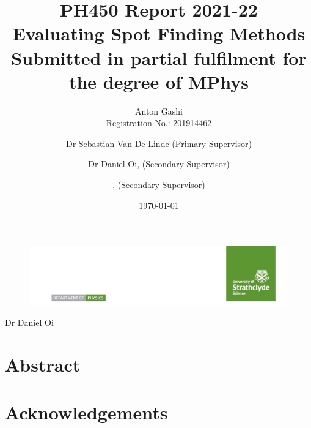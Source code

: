\documentclass[aps,pra,a4paper,nofootinbib,onecolumn,tightenlines,longbibliography,12pt,amsfonts,amssymb,amsmath,floatfix]{revtex4-2} %
\newcommand{\projecttitle}{Evaluating Spot Finding Methods}%
\newcommand{\studentname}{Anton Gashi}%
\newcommand{\regnumber}{201914462}
\newcommand{\degree}{MPhys}
\newcommand{\primarysup}{Dr Sebastian Van De Linde}
\newcommand{\secondsup}{Dr Daniel Oi}%
\begin{document}

\begin{figure}
\includegraphics[width=\textwidth]{ScienceLogo.png}
\end{figure}

\title{PH450 Report 2021-22\\ \vspace{1cm}
{\huge \projecttitle}\\[0.5cm] %
{\footnotesize Submitted in partial fulfilment for the degree of \degree}}

\author{\studentname\\
Registration No.: \regnumber}

\author{\primarysup{} (Primary Supervisor)}
\noaffiliation
\ifdefined\secondsup %
\author{\secondsup, (Secondary Supervisor)} %
\noaffiliation
\fi
\ifdefined\thirdsup
\author{\thirdsup, (Secondary Supervisor)} %
\noaffiliation
\fi

\date{\today}


\maketitle

\newpage %


\section*{Abstract} %

\newpage
\section*{Acknowledgements}
\end{document}
